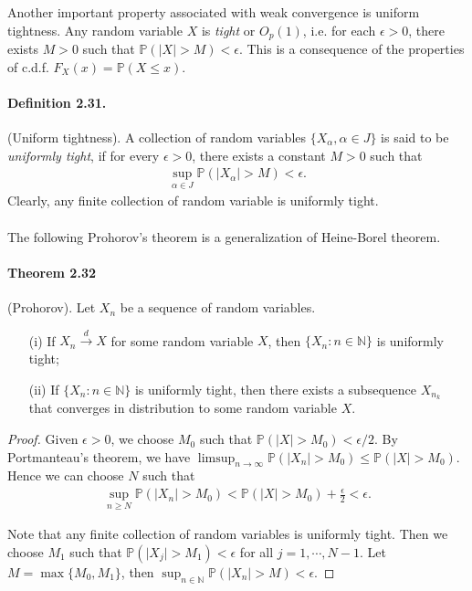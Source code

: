 \documentclass{article}
\numberwithin{equation}{section}
\renewcommand{\P}{\mathbb{P}}
\renewcommand{\proofname}{\textit{Proof}}
\theoremstyle{plain}
\theoremstyle{definition}
\begin{document}
Another important property associated with weak convergence is uniform tightness. Any random variable $X$ is \textit{tight} or $O_p(1)$, i.e. for each $\epsilon>0$, there exists $M>0$ such that $\P(\vert X\vert>M) < \epsilon$. This is a consequence of the properties of c.d.f. $F_X(x)=\P(X\leq x)$.
\paragraph{Definition 2.31.\label{def:2.31}} (Uniform tightness). A collection of random variables $\{X_\alpha,\alpha\in J\}$ is said to be \textit{uniformly tight}, if for every $\epsilon>0$, there exists a constant $M>0$ such that
\begin{align*}
	\sup_{\alpha\in J}\P\left(\vert X_\alpha\vert > M\right)<\epsilon.
\end{align*}
Clearly, any finite collection of random variable is uniformly tight.

\paragraph{} The following Prohorov's theorem is a generalization of Heine-Borel theorem.
\paragraph{Theorem 2.32\label{thm:2.32}} (Prohorov). Let $X_n$ be a sequence of random variables.
\begin{itemize}
	\item[(i)] If $X_n\overset{d}{\to}X$ for some random variable $X$, then $\{X_n:n\in\mathbb{N}\}$ is uniformly tight;
	\item[(ii)] If $\{X_n:n\in\mathbb{N}\}$ is uniformly tight, then there exists a subsequence $X_{n_k}$ that converges in distribution to some random variable $X$.
\end{itemize}
\renewcommand{\proofname}{Proof of \hyperref[thm:2.32]{Theorem 2.32 (i)}}
\begin{proof}
Given $\epsilon>0$, we choose $M_0$ such that $\P(\vert X\vert > M_0)<\epsilon/2$. By Portmanteau's theorem, we have $\limsup_{n\to\infty}\P(\vert X_n\vert >M_0)\leq\P(\vert X\vert>M_0)$. Hence we can choose $N$ such that
\begin{align*}
	\sup_{n\geq N}\P(\vert X_n\vert>M_0)<\P(\vert X\vert >M_0) + \frac{\epsilon}{2} < \epsilon.
\end{align*}

Note that any finite collection of random variables is uniformly tight. Then we choose $M_1$ such that $\P(\vert X_j\vert > M_1)<\epsilon$ for all $j=1,\cdots,N-1$. Let $M=\max\{M_0,M_1\}$, then $\sup_{n\in\mathbb{N}}\P(\vert X_n\vert> M) <\epsilon$.
\end{proof}
\renewcommand{\proofname}{Proof}
\end{document}
